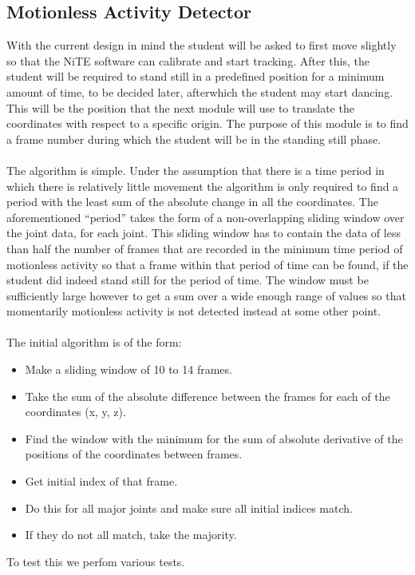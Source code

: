 \documentclass[a4paper]{article}
\begin{document}
\subsection{Motionless Activity Detector}
\noindent 
With the current design in mind the student will be asked to first move slightly so that the NiTE software can calibrate and start tracking. After this, the student will be required to stand still in a predefined position for a minimum amount of time, to be decided later, afterwhich the student may start dancing. This will be the position that the next module will use to translate the coordinates with respect to a specific origin. The purpose of this module is to find a frame number during which the student will be in the standing still phase.\\\\
\noindent 
The algorithm is simple. Under the assumption that there is a time period in which there is relatively little movement the algorithm is only required to find a period with the least sum of the absolute change in all the coordinates. The aforementioned ``period'' takes the form of a non-overlapping sliding window over the joint data, for each joint. This sliding window has to contain the data of less than half the number of frames that are recorded in the minimum time period of motionless activity so that a frame within that period of time can be found, if the student did indeed stand still for the period of time. The window must be sufficiently large however to get a sum over a wide enough range of values so that momentarily motionless activity is not detected instead at some other point.\\\\
\noindent
The initial algorithm is of the form:
\begin{itemize}
\setlength{\itemsep}{1pt}
\setlength{\parskip}{0pt}
\setlength{\parsep}{0pt}
	\item Make a sliding window of 10 to 14 frames.
	\item Take the sum of the absolute difference between the frames for each of the coordinates (x, y, z).
	\item Find the window with the minimum for the sum of absolute derivative of the positions of the coordinates between frames.
	\item Get initial index of that frame.
\item Do this for all major joints and make sure all initial indices match.
\item If they do not all match, take the majority. 
\end{itemize}
\noindent
To test this we perfom various tests.
\end{document}
